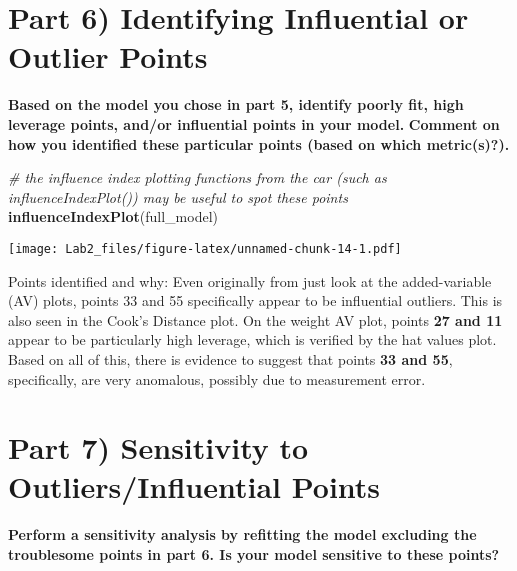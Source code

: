 \documentclass[
]{article}
\newenvironment{Shaded}{\begin{snugshade}}{\end{snugshade}}
\newcommand{\CommentTok}[1]{\textcolor[rgb]{0.56,0.35,0.01}{\textit{#1}}}
\newcommand{\FunctionTok}[1]{\textcolor[rgb]{0.13,0.29,0.53}{\textbf{#1}}}
\newcommand{\NormalTok}[1]{#1}
\begin{document}
\section{Part 6) Identifying Influential or Outlier
Points}\label{part-6-identifying-influential-or-outlier-points}

\textbf{Based on the model you chose in part 5, identify poorly fit,
high leverage points, and/or influential points in your model.}
\textbf{Comment on how you identified these particular points (based on
which metric(s)?).}

\begin{Shaded}
\begin{Highlighting}[]
\CommentTok{\# the influence index plotting functions from the \textasciigrave{}car\textasciigrave{} (such as influenceIndexPlot()) may be useful to spot these points}
\FunctionTok{influenceIndexPlot}\NormalTok{(full\_model)}
\end{Highlighting}
\end{Shaded}

\texttt{[image: Lab2\_files/figure-latex/unnamed-chunk-14-1.pdf]}

Points identified and why: Even originally from just look at the
added-variable (AV) plots, points 33 and 55 specifically appear to be
influential outliers. This is also seen in the Cook's Distance plot. On
the weight AV plot, points \textbf{27 and 11} appear to be particularly
high leverage, which is verified by the hat values plot. Based on all of
this, there is evidence to suggest that points \textbf{33 and 55},
specifically, are very anomalous, possibly due to measurement error.

\section{Part 7) Sensitivity to Outliers/Influential
Points}\label{part-7-sensitivity-to-outliersinfluential-points}

\textbf{Perform a sensitivity analysis by refitting the model excluding
the troublesome points in part 6. Is your model sensitive to these
points?}
\end{document}
